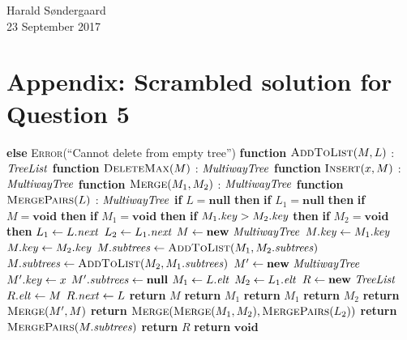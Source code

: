 \documentclass[11pt]{article}
\newcommand{\id}[1]{\mbox{\textit{#1}}}
\begin{document}
\begin{flushright}
Harald S{\o}ndergaard
\\ 23 September 2017
\end{flushright}
\hfill

\pagebreak
\section*{Appendix: Scrambled solution for Question 5}
\begin{algorithmic}
\State \textbf{else}
\State \textsc{Error}(``Cannot delete from empty tree'')
\State \textbf{function} $\textsc{AddToList}(M,L)$ : $\id{TreeList}$
\State \textbf{function} $\textsc{DeleteMax}(M)$ : $\id{MultiwayTree}$
\State \textbf{function} $\textsc{Insert}(x,M)$ : $\id{MultiwayTree}$
\State \textbf{function} $\textsc{Merge}(M_1,M_2)$ : $\id{MultiwayTree}$
\State \textbf{function} $\textsc{MergePairs}(L)$ : $\id{MultiwayTree}$
\State \textbf{if} $L = \mathbf{null}$ \textbf{then}
\State \textbf{if} $L_1 = \mathbf{null}$ \textbf{then}
\State \textbf{if} $M = \mathbf{void}$ \textbf{then}
\State \textbf{if} $M_1 = \mathbf{void}$ \textbf{then}
\State \textbf{if} $M_1.\id{key} > M_2.\id{key}$ \textbf{then}
\State \textbf{if} $M_2 = \mathbf{void}$ \textbf{then}
\State $L_1 \gets L.\id{next}$
\State $L_2 \gets L_1.\id{next}$
\State $M \gets \mathbf{new}\ \id{MultiwayTree}$
\State $M.\id{key} \gets M_1.\id{key}$
\State $M.\id{key} \gets M_2.\id{key}$
\State $M.\id{subtrees} \gets \textsc{AddToList}(M_1,M_2.\id{subtrees})$
\State $M.\id{subtrees} \gets \textsc{AddToList}(M_2,M_1.\id{subtrees})$
\State $M' \gets \mathbf{new}\ \id{MultiwayTree}$
\State $M'.\id{key} \gets x$
\State $M'.\id{subtrees} \gets \mathbf{null}$
\State $M_1 \gets L.\id{elt}$
\State $M_2 \gets L_1.\id{elt}$
\State $R \gets \mathbf{new}\ \id{TreeList}$
\State $R.\id{elt} \gets M$
\State $R.\id{next} \gets L$
\State \textbf{return} $M$
\State \textbf{return} $M_1$
\State \textbf{return} $M_1$
\State \textbf{return} $M_2$
\State \textbf{return} $\textsc{Merge}(M',M)$
\State \textbf{return} 
       $\textsc{Merge}(\textsc{Merge}(M_1,M_2),\textsc{MergePairs}(L_2))$
\State \textbf{return} $\textsc{MergePairs}(M.\id{subtrees})$
\State \textbf{return} $R$
\State \textbf{return} $\mathbf{void}$
\end{algorithmic}
\end{document}
